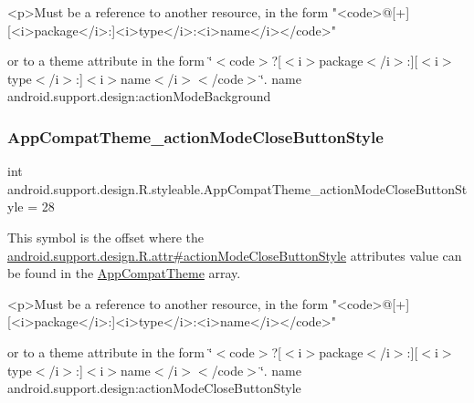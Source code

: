 \begin{DoxyVerb}      <p>Must be a reference to another resource, in the form "<code>@[+][<i>package</i>:]<i>type</i>:<i>name</i></code>"
\end{DoxyVerb}
 or to a theme attribute in the form \char`\"{}$<$code$>$?\mbox{[}$<$i$>$package$<$/i$>$\+:\mbox{]}\mbox{[}$<$i$>$type$<$/i$>$\+:\mbox{]}$<$i$>$name$<$/i$>$$<$/code$>$\char`\"{}.  name android.\+support.\+design\+:action\+Mode\+Background \mbox{\label{classandroid_1_1support_1_1design_1_1R_1_1styleable_a140f9d445f81bdf8ba5f95c0542ca529}} 
\subsubsection{\texorpdfstring{App\+Compat\+Theme\+\_\+action\+Mode\+Close\+Button\+Style}{AppCompatTheme\_actionModeCloseButtonStyle}}
{\footnotesize\ttfamily int android.\+support.\+design.\+R.\+styleable.\+App\+Compat\+Theme\+\_\+action\+Mode\+Close\+Button\+Style = 28\hspace{0.3cm}{\ttfamily [static]}}

This symbol is the offset where the \hyperlink{classandroid_1_1support_1_1design_1_1R_1_1attr_af2fceeea8a5606613dd831df4b13e4e9}{android.\+support.\+design.\+R.\+attr\#action\+Mode\+Close\+Button\+Style} attribute\textquotesingle{}s value can be found in the \hyperlink{classandroid_1_1support_1_1design_1_1R_1_1styleable_afb351dc8de20cbd4c89abe360373010c}{App\+Compat\+Theme} array.

\begin{DoxyVerb}      <p>Must be a reference to another resource, in the form "<code>@[+][<i>package</i>:]<i>type</i>:<i>name</i></code>"
\end{DoxyVerb}
 or to a theme attribute in the form \char`\"{}$<$code$>$?\mbox{[}$<$i$>$package$<$/i$>$\+:\mbox{]}\mbox{[}$<$i$>$type$<$/i$>$\+:\mbox{]}$<$i$>$name$<$/i$>$$<$/code$>$\char`\"{}.  name android.\+support.\+design\+:action\+Mode\+Close\+Button\+Style \mbox{\label{classandroid_1_1support_1_1design_1_1R_1_1styleable_aac470b6ebccb4d44a9441e2ca1de77dc}} 
